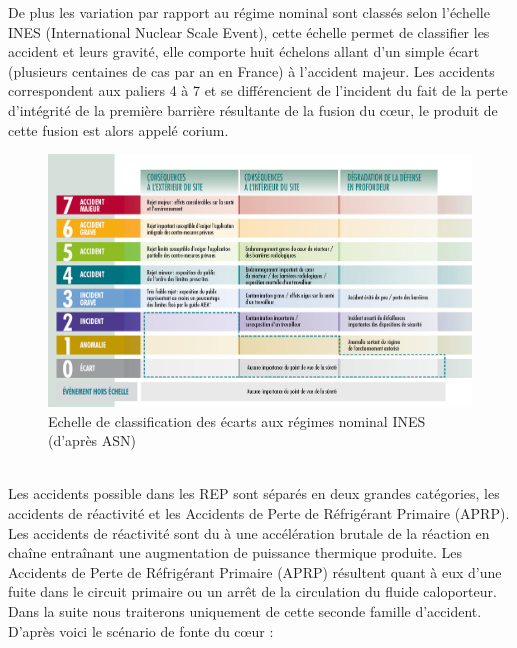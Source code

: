 \documentclass[a4paper,11pt,fleqn]{report}    %
\begin{document}
De plus les variation par rapport au régime nominal sont classés selon l'échelle INES (International Nuclear Scale Event), cette échelle permet de classifier les accident et leurs gravité, elle comporte huit échelons allant d'un simple écart (plusieurs centaines de cas par an en France) à l'accident majeur. Les accidents correspondent aux paliers 4 à 7 et se différencient de l'incident du fait de la perte d'intégrité de la première barrière résultante de la fusion du c\oe ur, le produit de cette fusion est alors appelé corium.
\begin{figure}[h!]
	\centering
	\includegraphics[width=0.7\linewidth]{figure/echelle-ines-article}
	\caption[Echelle de classification des écarts aux régimes nominal INES]{Echelle de classification des écarts aux régimes nominal INES (d'après ASN)}
	\label{fig:echelle-ines-article}
\end{figure}\\
Les accidents possible dans les REP sont séparés en deux grandes catégories, les accidents de réactivité et les Accidents de Perte de Réfrigérant Primaire (APRP). Les accidents de réactivité sont du à une accélération brutale de la réaction en chaîne entraînant une augmentation de puissance thermique produite. Les Accidents de Perte de Réfrigérant Primaire (APRP) résultent quant à eux d'une fuite dans le circuit primaire ou un arrêt de la circulation du fluide caloporteur. Dans la suite nous traiterons uniquement de cette seconde famille d'accident.
D'après \cite{kolev_multiphase_2015} voici le scénario de fonte du c\oe ur :
\end{document}
